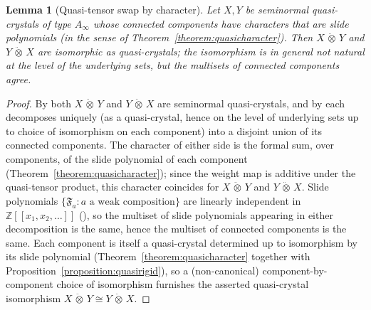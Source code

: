 \documentclass{amsart}
\newtheorem{lemma}{Lemma}[subsection]
\theoremstyle{definition}
\theoremstyle{remark}
\numberwithin{equation}{subsection}
\begin{document}
\begin{lemma}[Quasi-tensor swap by character]\label{lemma:quasitensorswap}
Let $X,Y$ be seminormal quasi-crystals of type $A_{\infty}$ whose connected components have characters that are slide polynomials (in the sense of Theorem~\ref{theorem:quasicharacter}). Then $X\,\ddot\otimes\, Y$ and $Y\,\ddot\otimes\, X$ are isomorphic as quasi-crystals; the isomorphism is in general not natural at the level of the underlying sets, but the multisets of connected components agree.
\end{lemma}
\begin{proof}
By \cite[Theorem~5.1]{cain2023quasicrystals} both $X\,\ddot\otimes\, Y$ and $Y\,\ddot\otimes\, X$ are seminormal quasi-crystals, and by \cite[Proposition~4.6]{cain2023quasicrystals} each decomposes uniquely (as a quasi-crystal, hence on the level of underlying sets up to choice of isomorphism on each component) into a disjoint union of its connected components. The character of either side is the formal sum, over components, of the slide polynomial of each component (Theorem~\ref{theorem:quasicharacter}); since the weight map is additive under the quasi-tensor product, this character coincides for $X\,\ddot\otimes\, Y$ and $Y\,\ddot\otimes\, X$. Slide polynomials $\{\mathfrak{F}_a:a\text{ a weak composition}\}$ are linearly independent in $\mathbb{Z}[[x_1,x_2,\ldots]]$ (\cite{assaf2017slide}), so the multiset of slide polynomials appearing in either decomposition is the same, hence the multiset of connected components is the same. Each component is itself a quasi-crystal determined up to isomorphism by its slide polynomial (Theorem~\ref{theorem:quasicharacter} together with Proposition~\ref{proposition:quasirigid}), so a (non-canonical) component-by-component choice of isomorphism furnishes the asserted quasi-crystal isomorphism $X\,\ddot\otimes\, Y\cong Y\,\ddot\otimes\, X$.
\end{proof}
\end{document}
